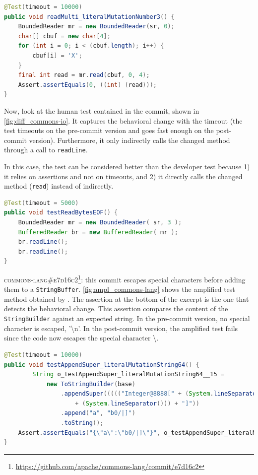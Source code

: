 \begin{lstlisting}[language=java,caption=Test generated by \DCII that detects the behavioral change introduced by commit \textsc{81210eb} in commons-io.,label=fig:ampl_commons-io]
@Test(timeout = 10000)
public void readMulti_literalMutationNumber3() {
	BoundedReader mr = new BoundedReader(sr, 0);
	char[] cbuf = new char[4];
	for (int i = 0; i < (cbuf.length); i++) {
		cbuf[i] = 'X';
	}
	final int read = mr.read(cbuf, 0, 4);
	Assert.assertEquals(0, ((int) (read)));
}        
\end{lstlisting}

Now, look at the human test contained in the commit, shown in \autoref{fig:diff_commons-io}.
It captures the behavioral change with the timeout (the test timeouts on the pre-commit version and goes fast enough on the post-commit version). 
Furthermore, it only indirectly calls the changed method through a call to \texttt{readLine}.

In this case, the \DCI test can be considered better than the developer test because
1) it relies on assertions and not on timeouts, and
2) it directly calls the changed method (\texttt{read}) instead of indirectly. 

\begin{lstlisting}[language=java,caption=Developer test for commit \textsc{81210eb} of commons-io.,label=fig:diff_commons-io]
@Test(timeout = 5000)
public void testReadBytesEOF() {
	BoundedReader mr = new BoundedReader( sr, 3 );
	BufferedReader br = new BufferedReader( mr );
	br.readLine();
	br.readLine();
}
\end{lstlisting}

\textsc{commons-lang\#e7d16c2}\footnote{\url{https://github.com/apache/commons-lang/commit/e7d16c2}}: this commit escapes special characters before adding them to a \texttt{StringBuffer}.
\autoref{fig:ampl_commons-lang} shows the amplified test method obtained by \DCII.
The assertion at the bottom of the excerpt is the one that detects the behavioral change.
This assertion compares the content of the \texttt{StringBuilder} against an expected string.
In the pre-commit version, no special character is escaped, \eg '\textbackslash n'.
In the post-commit version, the amplified test fails since the code now escapes the special character \textbackslash.

\begin{lstlisting}[language=java,caption=Test generated by \DCII that detects the behavioral change of \textsc{e7d16c2} in commons-lang.,label=fig:ampl_commons-lang]
@Test(timeout = 10000)
public void testAppendSuper_literalMutationString64() {
		String o_testAppendSuper_literalMutationString64__15 = 
			new ToStringBuilder(base)
				.appendSuper((((("Integer@8888[" + (System.lineSeparator())) + "  null") 
					+ (System.lineSeparator())) + "]"))
				.append("a", "b0/|]")
				.toString();
	Assert.assertEquals("{\"a\":\"b0/|]\"}", o_testAppendSuper_literalMutationString64__15);
}
\end{lstlisting}

